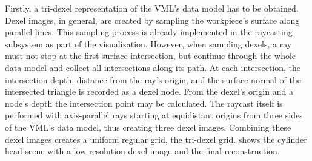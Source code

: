Firstly, a tri-dexel representation of the VML's data model has to be obtained.
Dexel images, in general, are created by sampling the workpiece's surface along parallel lines.
This sampling process is already implemented in the raycasting subsystem as part of the visualization.
However, when sampling dexels, a ray must not stop at the first surface intersection, but continue through the whole data model and collect all intersections along its path.
At each intersection, the intersection depth, \ie distance from the ray's origin, and the surface normal of the intersected triangle is recorded as a dexel node.
From the dexel's origin and a node's depth the intersection point may be calculated.
The raycast itself is performed with axis-parallel rays starting at equidistant origins from three sides of the VML's data model, thus creating three dexel images.
Combining these dexel images creates a uniform regular grid, the tri-dexel grid.
 shows the cylinder head scene with a low-resolution dexel image and the final reconstruction.

